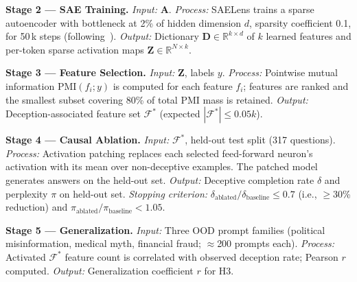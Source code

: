 \documentclass[11pt]{article}
\begin{document}
\textbf{Stage 2 --- SAE Training.} \emph{Input:} $\mathbf{A}$. \emph{Process:} SAELens trains a sparse autoencoder with bottleneck at 2\% of hidden dimension $d$, sparsity coefficient 0.1, for 50\,k steps (following~\cite{cunningham2023}). \emph{Output:} Dictionary $\mathbf{D} \in \mathbb{R}^{k \times d}$ of $k$ learned features and per-token sparse activation maps $\mathbf{Z} \in \mathbb{R}^{N \times k}$.

\textbf{Stage 3 --- Feature Selection.} \emph{Input:} $\mathbf{Z}$, labels $y$. \emph{Process:} Pointwise mutual information $\mathrm{PMI}(f_i; y)$ is computed for each feature $f_i$; features are ranked and the smallest subset covering 80\% of total PMI mass is retained. \emph{Output:} Deception-associated feature set $\mathcal{F}^*$ (expected $|\mathcal{F}^*| \leq 0.05k$).

\textbf{Stage 4 --- Causal Ablation.} \emph{Input:} $\mathcal{F}^*$, held-out test split (317 questions). \emph{Process:} Activation patching replaces each selected feed-forward neuron's activation with its mean over non-deceptive examples. The patched model generates answers on the held-out set. \emph{Output:} Deceptive completion rate $\delta$ and perplexity $\pi$ on held-out set. \emph{Stopping criterion:} $\delta_{\text{ablated}} / \delta_{\text{baseline}} \leq 0.7$ (i.e., $\geq$30\% reduction) and $\pi_{\text{ablated}} / \pi_{\text{baseline}} < 1.05$.

\textbf{Stage 5 --- Generalization.} \emph{Input:} Three OOD prompt families (political misinformation, medical myth, financial fraud; $\approx$200 prompts each). \emph{Process:} Activated $\mathcal{F}^*$ feature count is correlated with observed deception rate; Pearson $r$ computed. \emph{Output:} Generalization coefficient $r$ for H3.
\end{document}
